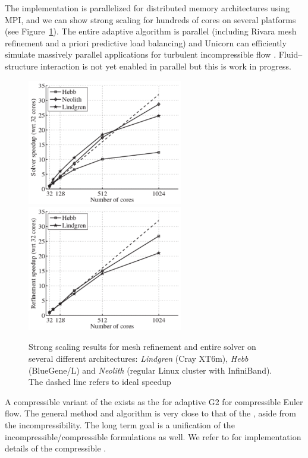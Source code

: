 The  implementation is parallelized for distributed memory
architectures using MPI, and we can show strong scaling for hundreds
of cores on several platforms (see Figure~\ref{fig:hoffman-2:sp}). The
entire adaptive algorithm is parallel (including Rivara mesh refinement
and a priori predictive load balancing) and Unicorn can efficiently
simulate massively parallel applications for turbulent incompressible
flow \citep{JanssonHoffmanJansson2010, Jansson2011}. Fluid--structure
interaction is not yet enabled in parallel but this is work in progress.

\begin{figure}
\centering
\includegraphics[height=5.5cm]{chapters/hoffman-2/pdf/speedup_solve.pdf}
\includegraphics[height=5.5cm]{chapters/hoffman-2/pdf/speedup_unrivara.pdf}
\caption{\label{fig:hoffman-2:sp} Strong scaling results for mesh
refinement and entire solver on several different architectures:
\textit{Lindgren} (Cray XT6m), \textit{Hebb} (BlueGene/L) and
\textit{Neolith} (regular Linux cluster with InfiniBand). The dashed
line refers to ideal speedup}
\end{figure}

A compressible variant of the  exists as the 
for adaptive G2 for compressible Euler flow. The general method
and algorithm is very close to that of the , aside
from the incompressibility. The long term goal is a unification of
the incompressible/compressible formulations as well. We refer to
\citet{Nazarov2009} for implementation details of the compressible
.

